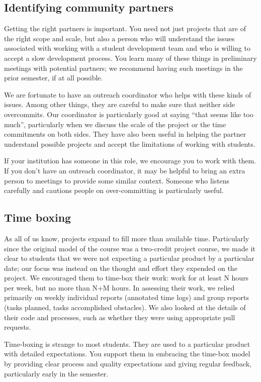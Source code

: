 \subsection{Identifying community partners}

Getting the right partners is important.  You need not just projects that
are of the right scope and scale, but also a person who will understand
the issues associated with working with a student development team and
who is willing to accept a slow development process.  You learn many of
these things in preliminary meetings with potential partners; we recommend
having such meetings in the prior semester, if at all possible.

We are fortunate to have an outreach coordinator who helps with these kinds
of issues.  Among other things, they are careful to make sure that neither
side overcommits.  Our coordinator is particularly good at saying ``that
seems like too much'', particularly when we discuss the scale of the project
or the time commitments on both sides.  They have also been useful in
helping the partner understand possible projects and accept the limitations
of working with students.

If your institution has someone in this role, we encourage you to work with
them.  If you don't have an outreach coordinator, it may be helpful to
bring an extra person to meetings to provide some similar context.  Someone
who listens carefully and cautions people on over-committing is particularly
useful.

\subsection{Time boxing}

As all of us know, projects expand to fill more than available time.
Particularly since the original model of the course was a two-credit
project course, we made it clear to students that we were not expecting
a particular product by a particular date; our focus was instead on the
thought and effort they expended on the project.  We encouraged them
to time-box their work: work for at least N hours per week, but no more
than N+M hours.  In assessing their work, we relied primarily on
weekly individual reports (annotated time logs) and group reports
(tasks planned, tasks accomplished obstacles).  We also looked at the
details of their code and processes, such as whether they were using
appropriate pull requests.

Time-boxing is strange to most students.  They are used to a particular
product with detailed expectations.  You support them in embracing the
time-box model by providing clear process and quality expectations and
giving regular feedback, particularly early in the semester.

